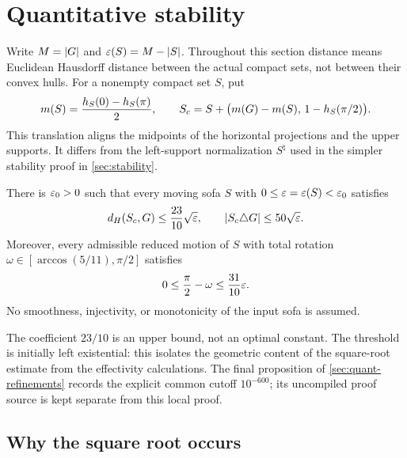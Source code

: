 \section{Quantitative stability}\label{sec:quant-stability-overview}

Write $M=\lvert G\rvert$ and $\varepsilon(S)=M-\lvert S\rvert$. Throughout this section distance
means Euclidean Hausdorff distance between the actual compact sets, not between
their convex hulls. For a nonempty compact set $S$, put
\[
 m(S)=\frac{h_S(0)-h_S(\pi)}2,
 \qquad
 S_c=S+\bigl(m(G)-m(S),\,1-h_S(\pi/2)\bigr).
\]
This translation aligns the midpoints of the horizontal projections and the
upper supports. It differs from the left-support normalization $S^\natural$
used in the simpler stability proof in \cref{sec:stability}.

\begin{theorem}
\label{thm:quant-explicit-stability}
There is $\varepsilon_0>0$ such that every moving sofa $S$ with
$0\le\varepsilon=\varepsilon(S)<\varepsilon_0$ satisfies
\[
 d_H(S_c,G)\le\frac{23}{10}\sqrt{\varepsilon},
 \qquad
 \lvert S_c\triangle G\rvert\le50\sqrt{\varepsilon}.
\]
Moreover, every admissible reduced motion of $S$ with total rotation
$\omega\in[\arccos(5/11),\pi/2]$ satisfies
\[
 0\le\frac\pi2-\omega\le\frac{31}{10}\varepsilon.
\]
No smoothness, injectivity, or monotonicity of the input sofa is assumed.
\end{theorem}

The coefficient $23/10$ is an upper bound, not an optimal constant. The
threshold is initially left existential: this isolates the geometric content
of the square-root estimate from the effectivity calculations. The final
proposition of \cref{sec:quant-refinements} records the explicit common cutoff
$10^{-600}$; its uncompiled proof source is kept separate from this local proof.

\subsection{Why the square root occurs}

